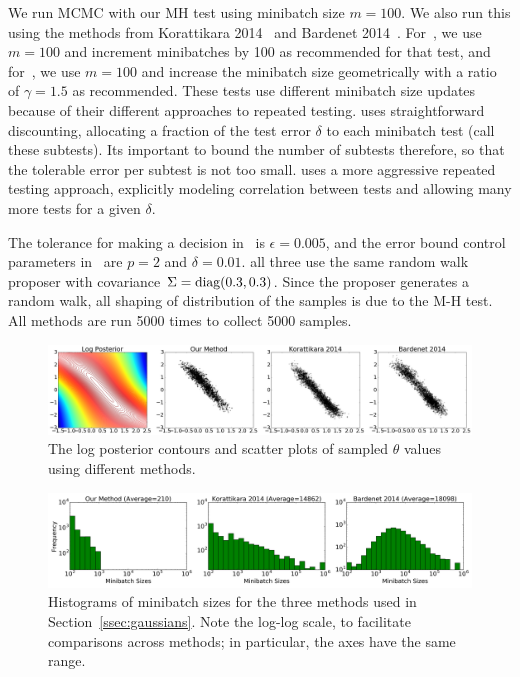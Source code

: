\documentclass{article}
\begin{document}
We run MCMC with our MH test using minibatch size $m=100$.  We also
run this using the methods from Korattikara
2014~\cite{cutting_mh_2014} and Bardenet
2014~\cite{icml2014c1_bardenet14}. For~\cite{cutting_mh_2014}, we use
$m=100$ and increment minibatches by 100 as recommended for that test,
and for~\cite{icml2014c1_bardenet14}, we use $m=100$ and increase the
minibatch size geometrically with a ratio of $\gamma = 1.5$ as
recommended. These tests use different minibatch size updates because
of their different approaches to repeated
testing. \cite{icml2014c1_bardenet14} uses straightforward
discounting, allocating a fraction of the test error $\delta$ to each
minibatch test (call these subtests). Its important to bound the
number of subtests therefore, so that the tolerable error per subtest is
not too small. \cite{cutting_mh_2014} uses a more aggressive repeated testing
approach, explicitly modeling correlation between tests and allowing many
more tests for a given $\delta$. 

The tolerance for making a decision in~\cite{cutting_mh_2014} is
$\epsilon=0.005$, and the error bound control parameters
in~\cite{icml2014c1_bardenet14} are $p = 2$ and $\delta = 0.01$.
all three use the same random walk proposer
with covariance $\Sigma={\rm diag}(0.3, 0.3)$. Since the proposer
generates a random walk, all shaping of distribution of the samples
is due to the M-H test. All methods are run 5000
times to collect 5000 samples.

\begin{figure}[t]
    \centering
    \includegraphics[width=1\linewidth]{GaussianMixtureResult/posterior_of_gaussian.png}
    \caption{
    The log posterior contours and scatter plots of sampled $\theta$ values using different methods. 
    }
    \label{fig:gauss_mix_1}
\end{figure}

\begin{figure}[t]
    \centering
    \includegraphics[width=1\linewidth]{minibatch_size_gaussian.png}
    \caption{
    Histograms of minibatch sizes for the three methods used in
    Section~\ref{ssec:gaussians}. Note the log-log scale, to facilitate
    comparisons across methods; in particular, the axes have the same
    range.
    }
    \label{fig:gauss_mix_2}
\end{figure}
\end{document}
